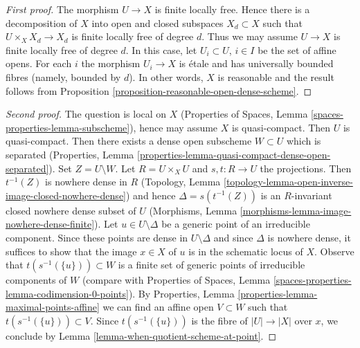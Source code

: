 \documentclass{stacks-project}
\theoremstyle{plain}
\theoremstyle{definition}
\theoremstyle{remark}
\numberwithin{equation}{subsection}
\begin{document}
\begin{proof}[First proof]
The morphism $U \to X$ is finite locally free. Hence there is a decomposition
of $X$ into open and closed subspaces $X_d \subset X$ such that
$U \times_X X_d \to X_d$ is finite locally free of degree $d$.
Thus we may assume $U \to X$ is finite locally free of degree $d$.
In this case, let $U_i \subset U$, $i \in I$ be the set of affine opens.
For each $i$ the morphism $U_i \to X$ is \'etale and has
universally bounded fibres (namely, bounded by $d$).
In other words, $X$ is reasonable and
the result follows from
Proposition \ref{proposition-reasonable-open-dense-scheme}.
\end{proof}

\begin{proof}[Second proof]
The question is local on $X$
(Properties of Spaces, Lemma \ref{spaces-properties-lemma-subscheme}),
hence may assume $X$ is quasi-compact. Then $U$ is quasi-compact.
Then there exists a dense open subscheme $W \subset U$ which is
separated (Properties, Lemma
\ref{properties-lemma-quasi-compact-dense-open-separated}).
Set $Z = U \setminus W$.
Let $R = U \times_X U$ and $s, t : R \to U$ the projections.
Then $t^{-1}(Z)$ is nowhere dense in $R$
(Topology, Lemma \ref{topology-lemma-open-inverse-image-closed-nowhere-dense})
and hence $\Delta = s(t^{-1}(Z))$ is an $R$-invariant
closed nowhere dense subset of $U$
(Morphisms, Lemma \ref{morphisms-lemma-image-nowhere-dense-finite}).
Let $u \in U \setminus \Delta$ be a generic point of an
irreducible component. Since these points are dense in $U \setminus \Delta$
and since $\Delta$ is nowhere dense, it suffices to show that the image
$x \in X$ of $u$ is in the schematic locus of $X$.
Observe that $t(s^{-1}(\{u\})) \subset W$ is a
finite set of generic points of irreducible components of $W$
(compare with
Properties of Spaces, Lemma
\ref{spaces-properties-lemma-codimension-0-points}).
By Properties, Lemma \ref{properties-lemma-maximal-points-affine}
we can find an affine open $V \subset W$ such that
$t(s^{-1}(\{u\})) \subset V$. Since $t(s^{-1}(\{u\}))$ is the fibre
of $|U| \to |X|$ over $x$, we conclude by
Lemma \ref{lemma-when-quotient-scheme-at-point}.
\end{proof}
\end{document}
